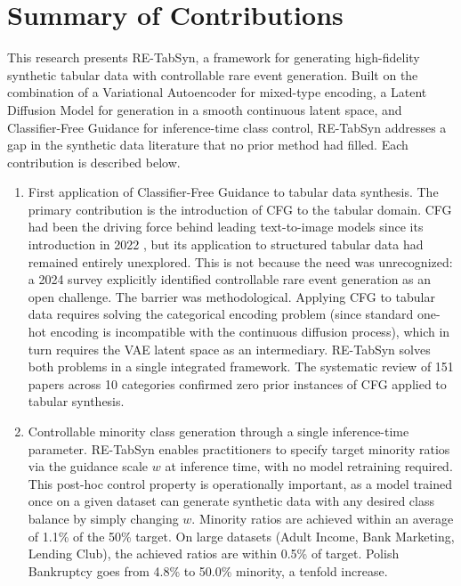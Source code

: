 \section{Summary of Contributions}

This research presents RE-TabSyn, a framework for generating high-fidelity synthetic tabular data with controllable rare event generation. Built on the combination of a Variational Autoencoder for mixed-type encoding, a Latent Diffusion Model for generation in a smooth continuous latent space, and Classifier-Free Guidance for inference-time class control, RE-TabSyn addresses a gap in the synthetic data literature that no prior method had filled. Each contribution is described below.

\begin{enumerate}
    \item First application of Classifier-Free Guidance to tabular data synthesis. The primary contribution is the introduction of CFG to the tabular domain. CFG had been the driving force behind leading text-to-image models since its introduction in 2022 \cite{ho2022cfg}, but its application to structured tabular data had remained entirely unexplored. This is not because the need was unrecognized: a 2024 survey \cite{nidhi2024rare} explicitly identified controllable rare event generation as an open challenge. The barrier was methodological. Applying CFG to tabular data requires solving the categorical encoding problem (since standard one-hot encoding is incompatible with the continuous diffusion process), which in turn requires the VAE latent space as an intermediary. RE-TabSyn solves both problems in a single integrated framework. The systematic review of 151 papers across 10 categories confirmed zero prior instances of CFG applied to tabular synthesis.

    \item Controllable minority class generation through a single inference-time parameter. RE-TabSyn enables practitioners to specify target minority ratios via the guidance scale $w$ at inference time, with no model retraining required. This post-hoc control property is operationally important, as a model trained once on a given dataset can generate synthetic data with any desired class balance by simply changing $w$. Minority ratios are achieved within an average of 1.1\% of the 50\% target. On large datasets (Adult Income, Bank Marketing, Lending Club), the achieved ratios are within 0.5\% of target. Polish Bankruptcy goes from 4.8\% to 50.0\% minority, a tenfold increase.


\end{enumerate}
